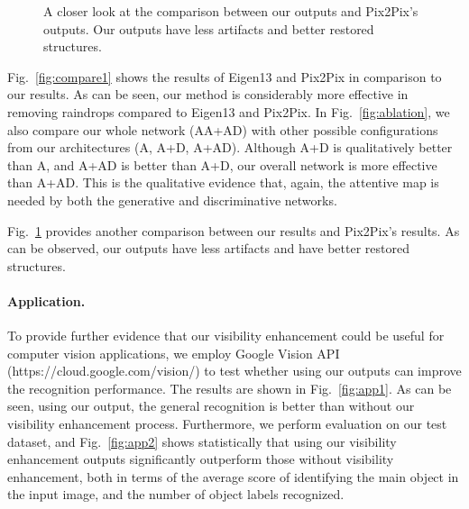 \documentclass[10pt,twocolumn,letterpaper]{article}
\def\WIDTHTHREE{0.315\linewidth}
\begin{document}
\begin{figure}
	\centering
	\centering
	\vfill\vspace{-2.5mm}\addtocounter{subfigure}{-3}
	\caption{A closer look at the comparison between our outputs and Pix2Pix's outputs. Our outputs have less artifacts and better restored structures.}
	\label{fig:compare2}
\end{figure}

Fig.~\ref{fig:compare1} shows the results of Eigen13 \cite{eigen2013restoring} and Pix2Pix \cite{isola2016image} in comparison to our results. As can be seen, our method is considerably more effective in removing raindrops compared to Eigen13 and Pix2Pix. In Fig.~\ref{fig:ablation}, we also compare our whole network (AA+AD) with other possible configurations from our architectures (A, A+D, A+AD). Although A+D is qualitatively better than A, and A+AD is better than A+D, our overall network is more effective than A+AD. This is the qualitative evidence that, again, the attentive map is needed by both the generative and discriminative networks.

Fig.~\ref{fig:compare2} provides another comparison between our results and Pix2Pix's results. As can be observed, our outputs have less artifacts and have better restored structures.





\paragraph{Application.}
To provide further evidence that our visibility enhancement could be useful for computer vision applications, we employ Google Vision API (https://cloud.google.com/vision/) to test whether using our outputs can improve the recognition performance.  The results  are shown in Fig.~\ref{fig:app1}. As can be seen, using our output, the general recognition is better than without our visibility enhancement process. Furthermore, we perform evaluation on our test dataset, and Fig.~\ref{fig:app2} shows statistically that using our visibility enhancement outputs significantly outperform those without visibility enhancement, both in terms of the average score of identifying the main object in the input image, and the number of object labels recognized.
\end{document}
